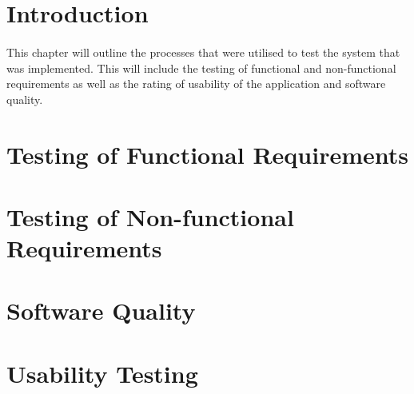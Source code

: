 \section{Introduction}
	\paragraph{}{
	This chapter will outline the processes that were utilised to test the system that was implemented. This will include the testing of functional and non-functional requirements as well as the rating of usability of the application and software quality.
	}
	
\section{Testing of Functional Requirements}
\section{Testing of Non-functional Requirements}
	
\section{Software Quality}
		
\section{Usability Testing}
	
	
